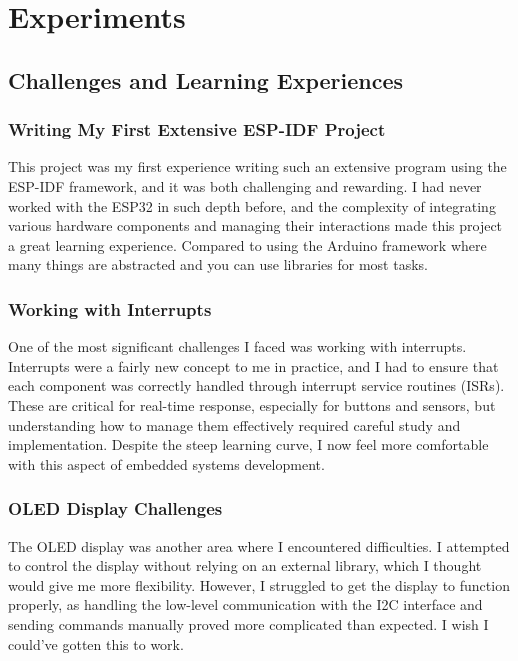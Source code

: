 \section{Experiments}
\label{sec:experiments}

\subsection{Challenges and Learning Experiences}

\subsubsection{Writing My First Extensive ESP-IDF Project}
This project was my first experience writing such an extensive program using the ESP-IDF framework, and it was both challenging and rewarding. I had never worked with the ESP32 in such depth before, and the complexity of integrating various hardware components and managing their interactions made this project a great learning experience. Compared to using the Arduino framework where many things are abstracted and you can use libraries for most tasks.

\subsubsection{Working with Interrupts}
One of the most significant challenges I faced was working with interrupts. Interrupts were a fairly new concept to me in practice, and I had to ensure that each component was correctly handled through interrupt service routines (ISRs). These are critical for real-time response, especially for buttons and sensors, but understanding how to manage them effectively required careful study and implementation. Despite the steep learning curve, I now feel more comfortable with this aspect of embedded systems development.

\subsubsection{OLED Display Challenges}
The OLED display was another area where I encountered difficulties. I attempted to control the display without relying on an external library, which I thought would give me more flexibility. However, I struggled to get the display to function properly, as handling the low-level communication with the I2C interface and sending commands manually proved more complicated than expected. I wish I could've gotten this to work.

